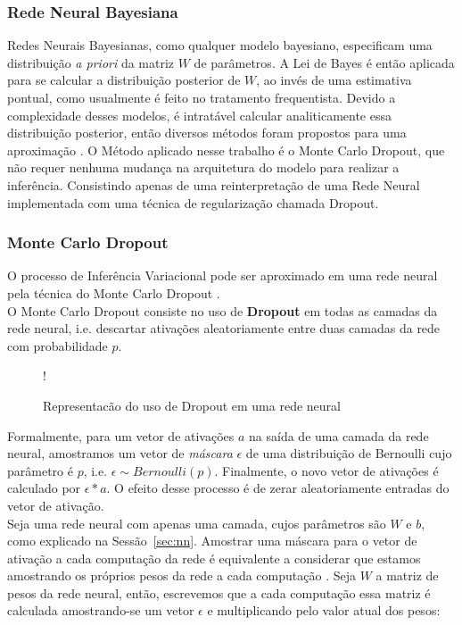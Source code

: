 \subsubsection{Rede Neural Bayesiana}

Redes Neurais Bayesianas, como qualquer modelo bayesiano, especificam uma distribuição \textit{a priori} da matriz $W$ de parâmetros.
A Lei de Bayes é então aplicada para se calcular a distribuição posterior de $W$, ao invés de uma estimativa pontual, como usualmente é feito no tratamento frequentista.
Devido a complexidade desses modelos, é intratável calcular analiticamente essa distribuição posterior, então diversos métodos foram propostos para uma aproximação \cite{Gal2016Uncertainty}.
O Método aplicado nesse trabalho é o Monte Carlo Dropout, que não requer nenhuma mudança na arquitetura do modelo para realizar a inferência. Consistindo apenas de uma reinterpretação de uma Rede Neural implementada com uma técnica de regularização chamada Dropout. 

\subsubsection{Monte Carlo Dropout}

O processo de Inferência Variacional pode ser aproximado em uma rede neural pela técnica do Monte Carlo Dropout \citep{dropbayes}. \\

O Monte Carlo Dropout consiste no uso de \textbf{Dropout} em todas as camadas da rede
neural, i.e. descartar ativações aleatoriamente entre duas camadas da rede com
probabilidade $p$.\\

\begin{figure}
  \centering
  \resizebox {\columnwidth} {!} {}
  \label{fig:dropout}
  \caption{Representacão do uso de Dropout em uma rede neural}
\end{figure}

Formalmente, para um vetor de ativações $a$ na saída de uma
camada da rede neural, amostramos um vetor de \textit{máscara} $\epsilon$ de uma
distribuição de Bernoulli cujo parâmetro é $p$, i.e. $\epsilon \sim Bernoulli(p)$.
Finalmente, o novo vetor de ativações é calculado por $\epsilon * a$. O efeito desse
processo é de zerar aleatoriamente entradas do vetor de ativação.
\\

Seja uma rede neural com apenas uma camada, cujos parâmetros são $W$ e $b$, como explicado na Sessão~\ref{sec:nn}. Amostrar uma máscara para o vetor de ativação a cada computação da rede é equivalente a considerar que estamos amostrando os próprios pesos da rede a cada computação \citep{dropbayes}. Seja $W$ a matriz de pesos da rede neural, então, escrevemos que a cada computação essa matriz é calculada amostrando-se um vetor $\epsilon$ e multiplicando pelo valor atual dos pesos: \\

